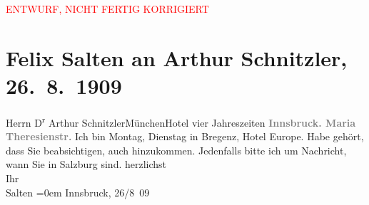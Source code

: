 
\begin{center}
            \textcolor{red}{ENTWURF, NICHT FERTIG KORRIGIERT}
                      \end{center}
            
         \renewcommand{\erwaehnteOrte}{Orte: Bregenz, Hotel Vier Jahreszeiten, Hotel de l’Europe, Innsbruck, Maria-Theresien-Straße, München, Salzburg}
         \renewcommand{\erwaehnteWerke}{}
               \section[Felix Salten an Arthur Schnitzler, 26. 8. 1909]{ Felix Salten an Arthur Schnitzler, 26. 8. 1909}\nopagebreak{}\rehead{ }\begin{ledgroupsized}[t]{13cm}\normalsize\beginnumbering \toendnotes[C]{\smallbreak\pagebreak[2]} 
\pstart{}{\pb}Herrn D\textsuperscript{r} Arthur Schnitzler\pend{}\pstart{}München\pend{}\pstart{}Hotel vier Jahreszeiten\pend{}{\bigskip}\pstart
           \noindent{}\centering{}{\pb}\textcolor{gray}{\textbf{Innsbruck. Maria Theresienstr.}}\pend
           \pstart
           Ich bin Montag, Dienstag in Bregenz, Hotel Europe. Habe gehört, dass Sie beabsichtigen, auch
               hinzukommen. Jedenfalls bitte ich um Nachricht, wann Sie in Salzburg sind.\pend
           \pstart
           herzlichst
               {\\[\baselineskip]}Ihr
               {\\[\baselineskip]}\spacefill\mbox{Salten}\pend
           \leftskip=0em{}\pstart
           Innsbruck, 26/8 09\pend
           
         
         \endnumbering{}\end{ledgroupsized}\begin{anhang}\end{anhang}\newcommand{\dateiname}{L03507}\newcommand{\titel}{Felix Salten an Arthur Schnitzler, 26. 8. 1909}\newcommand{\editorInnen}{Martin Anton Müller und Laura Untner}
      
